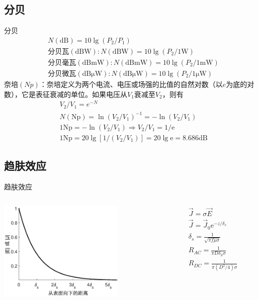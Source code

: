 \subsection{分贝}
\begin{frame}{分贝}
\begin{align*}
    &N(\mathrm{dB})=10\lg(P_2/P_1)\\
    &\text{分贝瓦}(\mathrm{dBW}):N(\mathrm{dBW})=10\lg(P_2/1\mathrm{W})\\
    &\text{分贝毫瓦}(\mathrm{dBmW}):N(\mathrm{dBmW})=10\lg(P_2/1\mathrm{mW})\\
    &\text{分贝微瓦}(\mathrm{dB\mu W}):N(\mathrm{dB\mu W})=10\lg(P_2/1\mathrm{\mu W})
\end{align*}
奈培$(Np)$：奈培定义为两个电流、电压或场强的比值的自然对数（以$e$为底的对数），它是表征衰减的单位。如果电压从$V_1$衰减至$V_2$，则有\\
\begin{align*}
    &V_2/V_1=e^{-N}\\
    &N(\mathrm{Np})=\ln(V_2/V_1)^{-1}=-\ln(V_2/V_1)\\
    &1\mathrm{Np}=-\ln(V_2/V_1)\Rightarrow V_2/V_1=1/\mathrm{e}\\
    &1\mathrm{Np}=20\lg[1/(V_2/V_1)]=20\lg\mathrm{e}=8.686\mathrm{dB}
\end{align*}
\end{frame}

\subsection{趋肤效应}
\begin{frame}{趋肤效应}
    \begin{columns}
        \begin{column}{0.6\linewidth}
            \centering
            \includegraphics[width=6cm]{fig2_9.eps}
        \end{column}
        \begin{column}{0.4\linewidth}
            \centering
            \begin{align*}
                &\vec J = \sigma \vec E\\
                &\vec J = \vec J_0 \mathrm{e}^{-z/\delta_s}\\
                &\delta_s = \frac{1}{\sqrt{\pi f\mu\sigma}}\\
                & R_{AC} = \frac{1}{\pi D\delta_S\sigma} \\
                & R_{DC} = \frac{1}{\pi(D^2/4)\sigma}
            \end{align*}
        \end{column}
    \end{columns}

\end{frame}